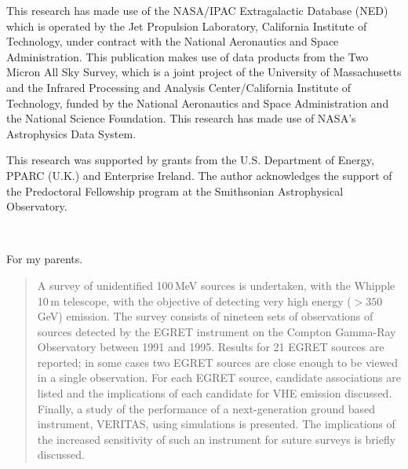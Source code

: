 \begin{singlespace}
{\scriptsize\begin{singlespace} This research has made use of the
NASA/IPAC Extragalactic Database (NED) which is operated by the Jet
Propulsion Laboratory, California Institute of Technology, under
contract with the National Aeronautics and Space Administration. This
publication makes use of data products from the Two Micron All Sky
Survey, which is a joint project of the University of Massachusetts
and the Infrared Processing and Analysis Center/California Institute
of Technology, funded by the National Aeronautics and Space
Administration and the National Science Foundation. This research has
made use of NASA's Astrophysics Data System.

This research was supported by grants from the U.S. Department of
Energy, PPARC (U.K.) and Enterprise Ireland. The author acknowledges
the support of the Predoctoral Fellowship program at the Smithsonian
Astrophysical Observatory.
\end{singlespace}}


\end{singlespace}

\newpage
\begin{singlespace}
~

\vspace*{\fill}
\centerline{For my parents.}
\vspace*{\fill}\vspace*{\fill}\vspace*{\fill}
\end{singlespace}

\setcounter{tocdepth}{1}
\tableofcontents
\listoftables          %
\listoffigures         %

\begin{abstract}

A survey of unidentified 100\,MeV \Gray sources is undertaken, with
the Whipple 10\,m telescope, with the objective of detecting very high
energy ($>350$\,GeV) \Gray emission. The survey consists of nineteen
sets of observations of sources detected by the EGRET instrument on
the Compton Gamma-Ray Observatory between 1991 and 1995. Results for
21 EGRET sources are reported; in some cases two EGRET sources are
close enough to be viewed in a single observation. For each EGRET
source, candidate associations are listed and the implications of each
candidate for VHE emission discussed. Finally, a study of the
performance of a next-generation ground based instrument, VERITAS,
using simulations is presented. The implications of the increased
sensitivity of such an instrument for suture \Gray surveys is briefly
discussed.

\end{abstract}
